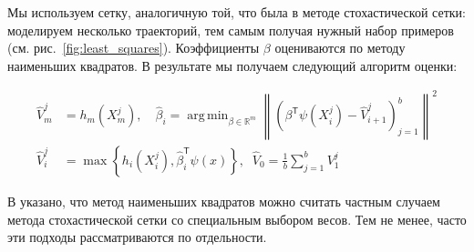 \documentclass[specialist,
               substylefile = ../spbu.rtx,
               subf,href,colorlinks=true, 10pt]{disser}
\newcommand{\R}{\ensuremath{\mathbb{R}}}
\newcommand{\norm}[1]{\left\lVert#1\right\rVert}
\newcommand{\Vhat}{\hat{V}}
\newcommand{\maxset}[1]{\max\left\lbrace#1\right\rbrace}
\DeclareMathOperator*{\argmin}{arg\,min}
\begin{document}
Мы используем сетку, аналогичную той, что была в методе стохастической сетки: моделируем несколько траекторий, тем самым получая нужный набор примеров (см. рис.~\ref{fig:least_squares}). Коэффициенты $\beta$ оцениваются по методу наименьших квадратов. В результате мы получаем следующий алгоритм оценки:

\begin{equation}
	\begin{aligned}
	\Vhat_m^j &= h_m(X_m^j), \quad \hat\beta_i = \argmin_{\beta\in\R^m} \norm{\left(\beta^\mathsf{T}\psi(X_i^j) - \Vhat_{i+1}^j\right)_{j=1}^b}^2 \\
		\Vhat_i^j &= \maxset{h_i(X_i^j), \hat \beta_i^\mathsf{T}\psi(x)},\;\; \Vhat_0 = \frac{1}{b}\sum_{j=1}^b V_1^j\end{aligned}\label{eq:least_squares}
\end{equation}

В \cite{Glasserman2004} указано, что метод наименьших квадратов можно считать частным случаем метода стохастической сетки со специальным выбором весов. Тем не менее, часто эти подходы рассматриваются по отдельности.









\end{document}
